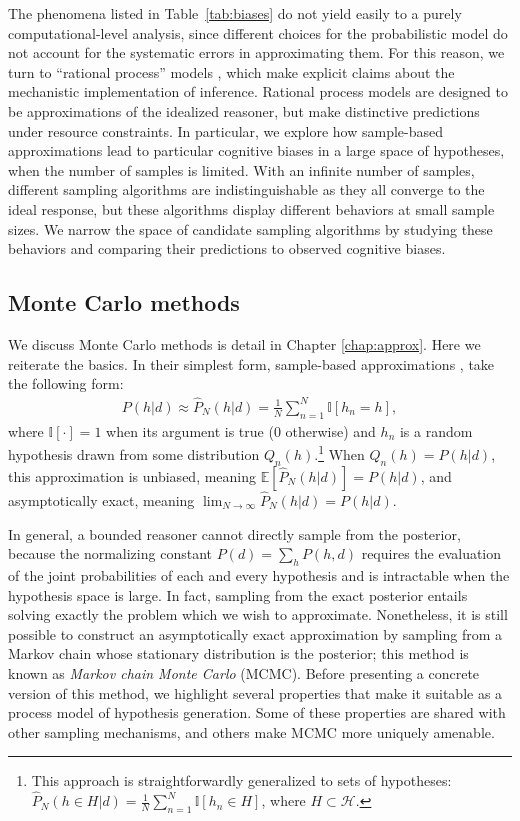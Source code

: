 The phenomena listed in Table~\ref{tab:biases} do not yield easily to a purely computational-level analysis, since different choices for the probabilistic model do not account for the systematic errors in approximating them. For this reason, we turn to ``rational process'' models \citep[see][for a review]{Griffiths2012BridgingCognition}, which make explicit claims about the mechanistic implementation of inference. Rational process models are designed to be approximations of the idealized reasoner, but make distinctive predictions under resource constraints. In particular, we explore how sample-based approximations lead to particular cognitive biases in a large space of hypotheses, when the number of samples is limited.
With an infinite number of samples, different sampling algorithms are indistinguishable as they all converge to the ideal response, but these algorithms display different behaviors at small sample sizes. We narrow the space of candidate sampling algorithms by studying these behaviors and comparing their predictions to observed cognitive biases.

\subsection{Monte Carlo methods}

We discuss Monte Carlo methods is detail in Chapter \ref{chap:approx}. Here we reiterate the basics. In their simplest form, sample-based approximations \citep[also known as \emph{Monte Carlo} approximations;][]{robert13}, take the following form:
\begin{align}
P(h|d) \approx \hat{P}_N(h|d) = \frac{1}{N}\sum_{n=1}^N \mathbb{I}[h_n=h],
\end{align}
where $\mathbb{I}[\cdot]=1$ when its argument is true (0 otherwise) and $h_n$ is a random hypothesis drawn from some distribution $Q_n(h)$.\footnote{This approach is straightforwardly generalized to sets of hypotheses: $\hat{P}_N(h \in H|d) = \frac{1}{N}\sum_{n=1}^N \mathbb{I}[h_n \in H]$, where $H \subset \mathcal{H}$.} When $Q_n(h) = P(h|d)$, this approximation is unbiased, meaning $\mathbb{E}[\hat{P}_N(h|d)] = P(h|d)$, and asymptotically exact, meaning $\lim_{N\rightarrow \infty} \hat{P}_N(h|d) = P(h|d)$.

In general, a bounded reasoner cannot directly sample from the posterior, because the normalizing constant $P(d) = \sum_{h} P(h,d)$ requires the evaluation of the joint probabilities of each and every hypothesis and is intractable when the hypothesis space is large. In fact, sampling from the exact posterior entails solving exactly the problem which we wish to approximate. Nonetheless, it is still possible to construct an asymptotically exact approximation by sampling from a Markov chain whose stationary distribution is the posterior; this method is known as \emph{Markov chain Monte Carlo} (MCMC). Before presenting a concrete version of this method, we highlight several properties that make it suitable as a process model of hypothesis generation. Some of these properties are shared with other sampling mechanisms, and others make MCMC more uniquely amenable.

